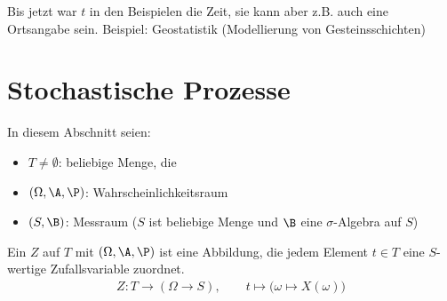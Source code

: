 Bis jetzt war $t$ in den Beispielen die Zeit, sie kann aber z.B. auch eine Ortsangabe sein.
Beispiel: Geostatistik (Modellierung von Gesteinsschichten)

\section{Stochastische Prozesse}
In diesem Abschnitt seien:
\begin{itemize}
	\item $T\neq\emptyset$: beliebige Menge, die 
	\item $(\Omega,\A,\P)$: Wahrscheinlichkeitsraum
	\item $(S,\B)$: Messraum ($S$ ist beliebige Menge und $\B$ eine $\sigma$-Algebra auf $S$)
\end{itemize}

\begin{definition}\label{def1.3.1}
	Ein 
	$Z$ auf $T$ mit 
	$(\Omega,\A,\P)$ ist eine Abbildung, die jedem Element $t\in T$ eine $S$-wertige Zufallsvariable zuordnet.
	\begin{align*}
		Z\colon T\to(\Omega\to S),\qquad t\mapsto\big(\omega\mapsto X(\omega)\big)
	\end{align*}
\end{definition}

